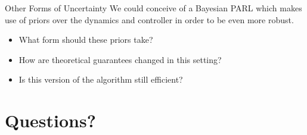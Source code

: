 \documentclass{beamer}
\begin{document}
\begin{frame}{Other Forms of Uncertainty}
  We could conceive of a Bayesian PARL which makes use of priors over the
  dynamics and controller in order to be even more robust. 

  \begin{itemize}
    \item What form should these priors take? 
    \item How are theoretical guarantees changed in this setting?
    \item Is this version of the algorithm still efficient?
  \end{itemize}
\end{frame}

\section{Questions?}
\end{document}
